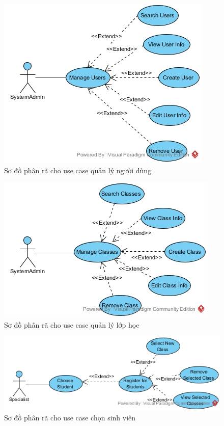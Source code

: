 \documentclass[12pt]{book}
\begin{document}
  \FloatBarrier
  \begin{figure}[ht]
    \centering
    \includegraphics[scale=0.5]{../pictures/projectdiagrams/Manage-Users-uc-destructing.jpg}
    \caption{Sơ đồ phân rã cho use case quản lý người dùng}
  \end{figure}
  \FloatBarrier

  \FloatBarrier
  \begin{figure}[ht]
    \centering
    \includegraphics[scale=0.5]{../pictures/projectdiagrams/Manage-Classes-uc-destructing.jpg}
    \caption{Sơ đồ phân rã cho use case quản lý lớp học}
  \end{figure}
  \FloatBarrier

  \FloatBarrier
  \begin{figure}[ht]
    \centering
    \includegraphics[scale=0.5]{../pictures/projectdiagrams/Choose-Student-uc-destructing.jpg}
    \caption{Sơ đồ phân rã cho use case chọn sinh viên}
  \end{figure}
  \FloatBarrier
\end{document}
